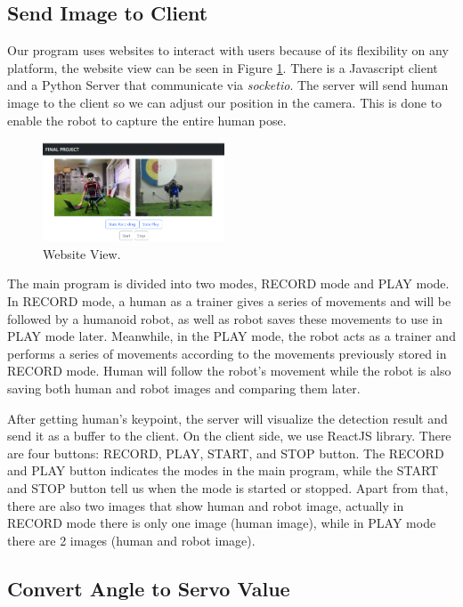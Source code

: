 \subsection{Send Image to Client}
\label{subsec:send-image-to-client}

Our program uses websites to interact with users because of its flexibility on any platform, the website view can be seen in Figure \ref{fig:websiteview}. There is a Javascript client and a Python Server that communicate via \emph{socketio}.
The server will send human image to the client so we can adjust our position in the camera. This is done to enable the robot to capture the entire human pose.
\begin{figure}[ht]
  \centering
  \includegraphics[width=0.48\textwidth]{gambar/web.png}
  \caption{Website View.}
  \label{fig:websiteview}
\end{figure}
The main program is divided into two modes, RECORD mode and PLAY mode. In RECORD mode, a human as a trainer gives a series of movements and will be followed by a humanoid robot, as well as robot saves these movements to use in PLAY mode later.
Meanwhile, in the PLAY mode, the robot acts as a trainer and performs a series of movements according to the movements previously stored in RECORD mode. Human will follow the robot's movement while the robot is also saving both human and robot images and comparing them later.

After getting human's keypoint, the server will visualize the detection result and send it as a buffer to the client.
On the client side, we use ReactJS library. There are four buttons: RECORD, PLAY, START, and STOP button. The RECORD and PLAY button indicates the modes in the main program, while the START and STOP button tell us when the mode is started or stopped.
Apart from that, there are also two images that show human and robot image, actually in RECORD mode there is only one image (human image), while in PLAY mode there are 2 images (human and robot image). 


\subsection{Convert Angle to Servo Value}
\label{subsec:convert-angle-to-servo-value}

